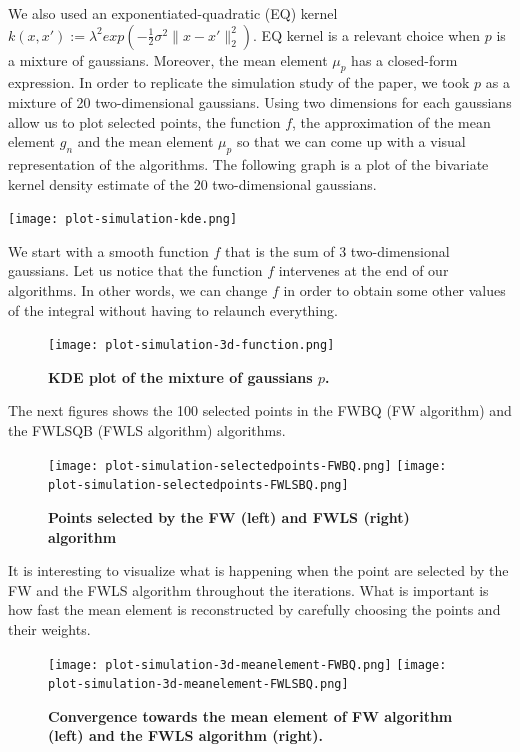 We also used an exponentiated-quadratic (EQ) kernel $k(x, x') := \lambda^{2} exp(-\frac{1}{2}\sigma^{2} \| x-x' \|_{2}^{2} )$. EQ kernel is a relevant choice when $p$ is a mixture of gaussians. Moreover, the mean element $\mu_{p}$ has a closed-form expression.
In order to replicate the simulation study of the paper, we took $p$ as a mixture of 20 two-dimensional gaussians. Using two dimensions for each gaussians allow us to plot selected points, the function $f$, the approximation of the mean element $g_n$ and the mean element $\mu_{p}$ so that we can come up with a visual representation of the algorithms.
\newpage
The following graph is a plot of the bivariate kernel density estimate of the 20 two-dimensional gaussians. \\
\begin{center}
	\texttt{[image: plot-simulation-kde.png]}
\end{center}
We start with a smooth function $f$ that is the sum of 3 two-dimensional gaussians. Let us notice that the function $f$ intervenes at the end of our algorithms. In other words, we can change $f$ in order to obtain some other values of the integral without having to relaunch everything.
\begin{figure}[H]
\begin{center}
	\texttt{[image: plot-simulation-3d-function.png]}
	\caption{\textbf{KDE plot of the mixture of gaussians $p$.}}
\end{center}
\end{figure}
The next figures shows the 100 selected points in the FWBQ (FW algorithm) and the FWLSQB (FWLS algorithm) algorithms.
\begin{figure}[H]
\begin{center}
	\texttt{[image: plot-simulation-selectedpoints-FWBQ.png]}
	\texttt{[image: plot-simulation-selectedpoints-FWLSBQ.png]}
	\caption{\textbf{Points selected by the FW (left) and FWLS (right) algorithm}}
\end{center}
\end{figure}
It is interesting to visualize what is happening when the point are selected by the FW and the FWLS algorithm throughout the iterations. What is important is how fast the mean element is reconstructed by carefully choosing the points and their weights.
\begin{figure}[H]
\begin{center}
	\texttt{[image: plot-simulation-3d-meanelement-FWBQ.png]}
	\texttt{[image: plot-simulation-3d-meanelement-FWLSBQ.png]}
	\caption{\textbf{Convergence towards the mean element of FW algorithm (left) and the FWLS algorithm (right).}}
\end{center}
\end{figure}
